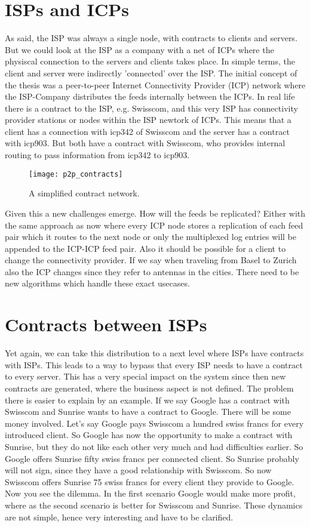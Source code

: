 \section{ISPs and ICPs}
As said, the ISP was always a single node, with contracts to clients and servers. But we could look at the ISP as a company with a net of ICPs where the physiscal connection to the servers and clients takes place. In simple terms, the client and server were indirectly ’connected’ over the ISP. The initial concept of the thesis was a peer-to-peer Internet Connectivity Provider (ICP) network where the ISP-Company distributes the feeds internally between the ICPs. In real life there is a contract to the ISP, e.g. Swisscom, and this very ISP has connectivity provider stations or nodes within the ISP newtork of ICPs. This means that a client has a connection with icp342 of Swisscom and the server has a contract with icp903. But both have a contract with Swisscom, who provides internal routing to pass information from icp342 to icp903.
\begin{figure}
    \centering
    \texttt{[image: p2p\_contracts]}
    \caption{A simplified contract network.}
    \label{fig:contract_network}
\end{figure}
Given this a new challenges emerge. How will the feeds be replicated? Either with the same approach as now where every ICP node stores a replication of each feed pair which it routes to the next node or only the multiplexed log entries will be appended to the ICP-ICP feed pair. Also it should be possible for a client to change the connectivity provider. If we say when traveling from Basel to Zurich also the ICP changes since they refer to antennas in the cities. There need to be new algorithms which handle these exact usecases.
\section{Contracts between ISPs}
Yet again, we can take this distribution to a next level where ISPs have contracts with ISPs. This leads to a way to bypass that every ISP needs to have a contract to every server. This has a very special impact on the system since then new contracts are generated, where the business aspect is not defined. The problem there is easier to explain by an example. If we say Google has a contract with Swisscom and Sunrise wants to have a contract to Google. There will be some money involved. Let's say Google pays Swisscom a hundred swiss francs for every introduced client. So Google has now the opportunity to make a contract with Sunrise, but they do not like each other very much and had difficulties earlier. So Google offers Sunrise fifty swiss francs per connected client. So Sunrise probably will not sign, since they have a good relationship with Swisscom. So now Swisscom offers Sunrise 75 swiss francs for every client they provide to Google. Now you see the dilemma. In the first scenario Google would make more profit, where as the second scenario is better for Swisscom and Sunrise. These dynamics are not simple, hence very interesting and have to be clarified. 
